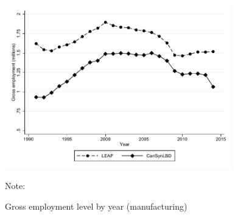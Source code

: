 \documentclass{article}
\begin{document}
\begin{figure} [H]
\centering
\caption{Gross employment level by year (manufacturing)} \label{GrossEmploymentManufacturing}
\includegraphics[height=2.8in, width=.7\linewidth]{graphs/Gross_employment_level_by_year_manufacturing_bw.pdf} 
\begin{minipage}{0.85\textwidth}
{\footnotesize Note: \TableNote  \par}
\end{minipage}
\end{figure}
\end{document}
